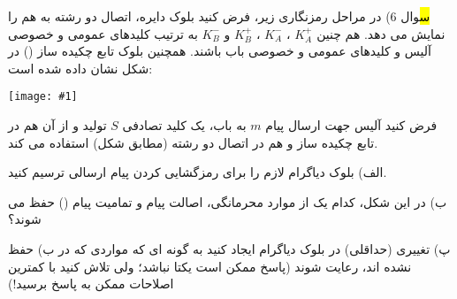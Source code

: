 \documentclass[10pt,letterpaper]{article}
\newcommand{\pic}[2]{
\begin{center}
\texttt{[image: \#1]}
\end{center}
}
\begin{document}
\Large
\hl
سوال 6) در مراحل رمزنگاری زیر، فرض کنید بلوک دایره، اتصال دو رشته به هم را نمایش می دهد. هم چنین 
$
K^+_A
$
، 
$
K^-_A
$
، 
$
K^+_B
$
 و  
$
K^-_B
$
 به ترتیب کلیدهای عمومی و خصوصی آلیس و کلیدهای عمومی و خصوصی باب باشند. همچنین بلوک تابع چکیده ساز () در شکل نشان داده شده است:
\pic{Q6_1}{110mm}
فرض کنید آلیس جهت ارسال پیام $m$ به باب، یک کلید تصادفی $S$ تولید و از آن هم در تابع چکیده ساز و هم در اتصال دو رشته (مطابق شکل) استفاده می کند.

الف) بلوک دیاگرام لازم را برای رمزگشایی کردن پیام ارسالی ترسیم کنید.

ب) در این شکل، کدام یک از موارد محرمانگی، اصالت پیام و تمامیت پیام () حفظ می شوند؟

پ) تغییری (حداقلی) در بلوک دیاگرام ایجاد کنید به گونه ای که مواردی که در ب) حفظ نشده اند، رعایت شوند (پاسخ ممکن است یکتا نباشد؛ ولی تلاش کنید با کمترین اصلاحات ممکن به پاسخ برسید!)
\end{document}
